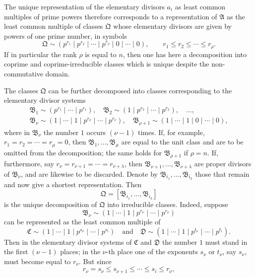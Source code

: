 \documentclass[11pt]{article}
\begin{document}
The unique representation of the elementary divisors $a_i$ as least common multiples of prime powers therefore corresponds to a representation of $\mathfrak A$ as the least common multiple of classes $\mathfrak Q$ whose elementary divisors are given by powers of one prime number, in symbols
\[
 \mathfrak Q\sim(p^{r_1}\mid p^{r_2}\mid\cdots\mid p^{r_\rho}\mid0\mid\cdots\mid0),
 \qquad r_1\le r_2\le\cdots\le r_\rho.
\]
If in particular the rank $\rho$ is equal to $n$, then one has here a decomposition into coprime and coprime-irreducible classes which is unique despite the non-commutative domain.

The classes $\mathfrak Q$ can be further decomposed into classes corresponding to the elementary divisor systems
\[
\begin{gathered}
 \mathfrak B_1\sim(p^{r_1}\mid\cdots\mid p^{r_1}),\quad
 \mathfrak B_2\sim(1\mid p^{r_2}\mid\cdots\mid p^{r_2}),\quad \ldots,\\
 \mathfrak B_\nu\sim(1\mid\cdots\mid1\mid p^{r_\nu}\mid\cdots\mid p^{r_\nu}),\quad
 \mathfrak B_{\rho+1}\sim(1\mid\cdots\mid1\mid0\mid\cdots\mid0),
\end{gathered}
\]
where in $\mathfrak B_\nu$ the number $1$ occurs $(\nu-1)$ times. If, for example, $r_1=r_2=\cdots=r_\mu=0$, then $\mathfrak B_1,
\ldots,\mathfrak B_\mu$ are equal to the unit class and are to be omitted from the decomposition; the same holds for $\mathfrak B_{\rho+1}$ if $\rho=n$. If, furthermore, say $r_\nu=r_{\nu+1}=\cdots=r_{\nu+\lambda}$, then $\mathfrak B_{\nu+1},
\ldots,\mathfrak B_{\nu+\lambda}$ are proper divisors of $\mathfrak B_\nu$, and are likewise to be discarded. Denote by $\mathfrak B_{i_1},
\ldots,\mathfrak B_{i_k}$ those that remain and now give a shortest representation. Then
\[
 \mathfrak Q=[\mathfrak B_{i_1},
\ldots,\mathfrak B_{i_k}]
\]
is the unique decomposition of $\mathfrak Q$ into irreducible classes. Indeed, suppose
\[
 \mathfrak B_\nu\sim(1\mid\cdots\mid1\mid p^{r_\nu}\mid\cdots\mid p^{r_\nu})
\]
can be represented as the least common multiple of
\[
 \mathfrak C\sim(1\mid\cdots\mid1\mid p^{s_\nu}\mid\cdots\mid p^{s_i})
 \quad\text{and}\quad
 \mathfrak D\sim(1\mid\cdots\mid1\mid p^{t_\nu}\mid\cdots\mid p^{t_i}).
\]
Then in the elementary divisor systems of $\mathfrak C$ and $\mathfrak D$ the number $1$ must stand in the first $(\nu-1)$ places; in the $\nu$-th place one of the exponents $s_\nu$ or $t_\nu$, say $s_\nu$, must become equal to $r_\nu$. But since
\[
 r_\nu=s_\nu\le s_{\nu+1}\le\cdots\le s_i\le r_\nu,
\]
\end{document}
